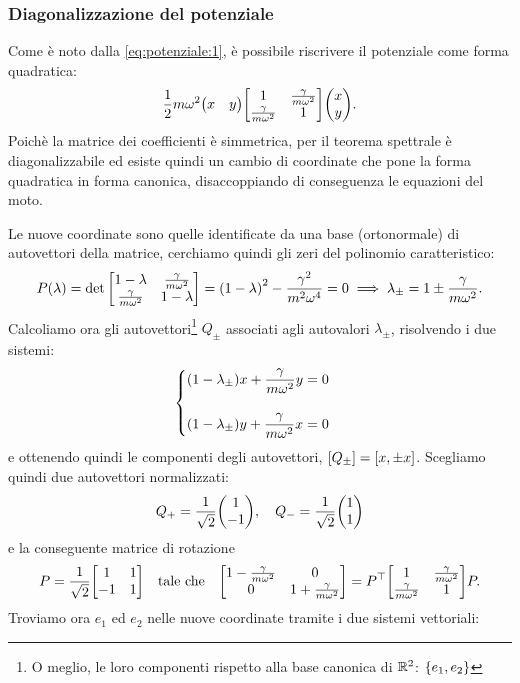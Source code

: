         \subsubsection{Diagonalizzazione del potenziale}
            Come \`e noto dalla \eqref{eq:potenziale:1}, \`e possibile riscrivere il potenziale come forma quadratica: $$\frac{1}{2}m\omega^2\mqty(x&y)\mqty[1 & \frac{\gamma}{m\omega^2} \\ \frac{\gamma}{m\omega^2} & 1]\mqty(x\\y).$$ Poich\`e la matrice dei coefficienti \`e simmetrica, per il teorema spettrale \`e diagonalizzabile ed esiste quindi un cambio di coordinate che pone la forma quadratica in forma canonica, disaccoppiando di conseguenza le equazioni del moto. \par Le nuove coordinate sono quelle identificate da una base (ortonormale) di autovettori della matrice, cerchiamo quindi gli zeri del polinomio caratteristico: $$P\qty(\lambda)=\det\mqty[1-\lambda & \frac{\gamma}{m\omega^2} \\ \frac{\gamma}{m\omega^2} & 1-\lambda]=\qty(1-\lambda)^2-\frac{\gamma^2}{m^2\omega^4}=0\implies\lambda_{\pm}=1\pm\frac{\gamma}{m\omega^2}.$$ Calcoliamo ora gli autovettori\footnote{O meglio, le loro componenti rispetto alla base canonica di $\mathbb{R}^2$: $\qty{e_1,e_2}$} $Q_{\pm}$ associati agli autovalori $\lambda_{\pm}$, risolvendo i due sistemi:
            \begin{equation*}
            \begin{cases}
                \displaystyle\qty(1-\lambda_{\pm})x+\frac{\gamma}{m\omega^2}y=0\\\\
                \displaystyle\qty(1-\lambda_{\pm})y+\frac{\gamma}{m\omega^2}x=0
            \end{cases}
            \end{equation*}
            e ottenendo quindi le componenti degli autovettori, $\qty[Q_{\pm}]=[x,\pm x]$. Scegliamo quindi due autovettori normalizzati: $$Q_{+}=\frac{1}{\sqrt{2}}\mqty(1 \\ -1),\quad Q_{-}=\frac{1}{\sqrt{2}}\mqty(1 \\ 1)$$ e la conseguente matrice di rotazione $$P=\frac{1}{\sqrt{2}}\mqty[1 & 1 \\ -1 & 1]\quad\text{tale che}\quad\mqty[1-\frac{\gamma}{m\omega^2} & 0 \\ 0 & 1+\frac{\gamma}{m\omega^2}]=P^\top\mqty[1 & \frac{\gamma}{m\omega^2} \\ \frac{\gamma}{m\omega^2} & 1]P.$$ Troviamo ora $e_1$ ed $e_2$ nelle nuove coordinate tramite i due sistemi vettoriali:
